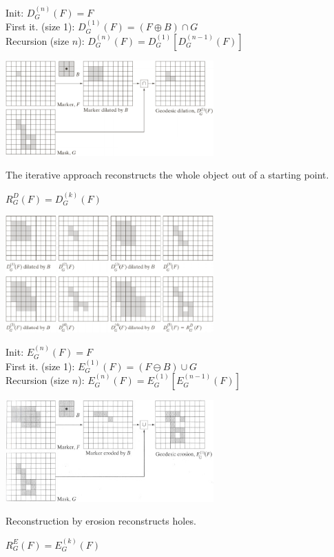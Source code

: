   \begin{minipage}{9.2cm}
      Init: $D_G^{(n)}(F)=F$ \\
      First it. (size 1): $D_G^{(1)}(F) = (F \oplus B) \cap G$\\
      Recursion (size $n$): $D_G^{(n)}(F) = D_G^{(1)}[D_G^{(n-1)}(F)]$
      
      \includegraphics[width=8cm]{./images/morphology_geodesic_dilation.png}
      
      The iterative approach reconstructs the whole object out of a starting point.
      
      $R_G^D(F) = D_G^{(k)}(F)$
      
      \includegraphics[width=8cm]{./images/morphology_reconstruction_dilation.png}
  \end{minipage}
  \begin{minipage}{9.2cm}
      Init: $E_G^{(n)}(F)=F$ \\
      First it. (size 1): $E_G^{(1)}(F) = (F \ominus B) \cup G$\\
      Recursion (size $n$): $E_G^{(n)}(F) = E_G^{(1)}[E_G^{(n-1)}(F)]$
        
      \includegraphics[width=8cm]{./images/morphology_geodesic_erosion.jpg}
      
      Reconstruction by erosion reconstructs holes.
      
      $R_G^E(F) = E_G^{(k)}(F)$
  \end{minipage}
  
